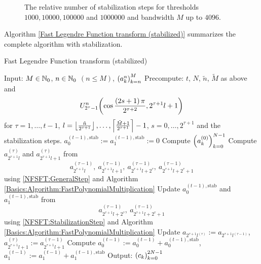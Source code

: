 \begin{figure}[htb]
  \caption{The relative number of stabilization steps for thresholds $1000, 10000, 100000$ and $1000000$ and bandwidth $M$ up to $4096$.}
  \label{NFSFT:figure:stabilization}
\end{figure}
Algorithm \ref{Fast Legendre Function transform (stabilized)} summarizes the complete algorithm with stabilization.
\begin{algorithm}[htb]
  \caption{Fast Legendre Function transform (stabilized)}
  \label{NFSFT:Algorithm:FLFT_stab}    
  \begin{algorithmic}
    \STATE Input:  $M \in \mathbb{N}_{0}$, $n \in \mathbb{N}_{0}$ $(n \le M)$, $\left(a_k^n\right)_{k=n}^{M}$
    \STATE Precompute: $t$, $N$, $\tilde{n}$, $\tilde{M}$ as above and $$U_{2^{\tau}-1}^{n}{\hspace{-0.4ex}}\left(\cos \frac{\left(2s+1\right)\pi}{2^{\tau+2}}, 2^{\tau+1}l+1\right)$$ 
    \STATE {} for $\tau = 1,\ldots,t-1$, $l = \left\lfloor\frac{\tilde{n}}{2^{\tau+1}}\right\rfloor,\ldots,\left\lceil\frac{\tilde{M}+1}{2^{\tau+1}}\right\rceil-1$, 
    \STATE {} $s = 0,\ldots,2^{\tau+1}$ and the stabilization steps.
    \STATE $a_{0}^{(t-1),\text{stab}} := a_{1}^{(t-1),\text{stab}} := 0$
    \STATE Compute $\left(a_{k}^{(0)}\right)_{k=0}^{N-1}$ 
          \STATE Compute $a_{2^{\tau+1}l}^{(\tau)}$ and $a_{2^{\tau+1}l+1}^{(\tau)}$ from $$a_{2^{\tau+1}l}^{(\tau-1)},\  
            a_{2^{\tau+1}l+1}^{(\tau-1)},\ a_{2^{\tau+1}l+2^{\tau}}^{(\tau-1)},\ a_{2^{\tau+1}l+2^{\tau}+1}^{(\tau-1)}$$ using 
            \eqref{NFSFT:GeneralStep} and Algorithm \ref{Basics:Algorithm:FastPolynomialMultiplication}
        \ELSE
          \STATE Update $a_{0}^{(t-1),\text{stab}}$ and $a_{1}^{(t-1),\text{stab}}$ from
            $$ 
              a_{2^{\tau+1}l+2^{\tau}}^{(\tau-1)},\ a_{2^{\tau+1}l+2^{\tau}+1}^{(\tau-1)}
            $$ 
            using \eqref{NFSFT:StabilizationStep} and Algorithm \ref{Basics:Algorithm:FastPolynomialMultiplication}
          \STATE Update $a_{2^{\tau+1}l^{(\tau)}} := a_{2^{\tau+1}l^{(\tau-1)}}$, $a_{2^{\tau+1}l+1}^{(\tau)} := a_{2^{\tau+1}l+1}^{(\tau-1)}$
        \ENDIF
      \ENDFOR
    \ENDFOR
    \STATE Compute $a_{0}^{(t-1)} := a_{0}^{(t-1)} + a_{0}^{(t-1),\text{stab}}$, $a_{1}^{(t-1)} := a_{1}^{(t-1)} + a_{1}^{(t-1),\text{stab}}$
    \STATE Output: $\left(c_{k}\right)_{k=0}^{2N-1}$
\end{algorithmic}
\end{algorithm}

